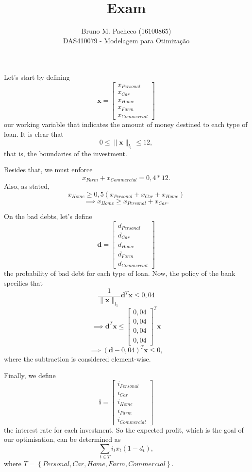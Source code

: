 \documentclass[a4paper]{report}
\begin{document}
 
\title{Exam}
\author{Bruno M. Pacheco (16100865)\\
DAS410079 - Modelagem para Otimização}
 
\maketitle
 

Let's start  by defining \[
\bm{x} = \begin{bmatrix} x_{Personal} \\ x_{Car} \\ x_{Home} \\ x_{Farm} \\ x_{Commercial} \end{bmatrix} 
\] our working variable that indicates the amount of money destined to each type of loan. It is clear that \[
0\le \|\bm{x}\|_{l_1} \le 12
,\] that is, the boundaries of the investment.

Besides that, we must enforce \[
x_{Farm} + x_{Commercial} = 0,4 * 12
.\] Also, as stated, \[
x_{Home} \ge 0,5 \left( x_{Personal} + x_{Car} + x_{Home} \right) 
\] \[
\implies x_{Home} \ge  x_{Personal} + x_{Car}
.\] 

On the bad debts, let's define \[
    \bm{d} = \begin{bmatrix} d_{Personal} \\ d_{Car} \\ d_{Home} \\ d_{Farm} \\ d_{Commercial} \end{bmatrix} 
\] the probability of bad debt for each type of loan. Now, the policy of the bank specifies that \[
    \frac{1}{\|\bm{x}\|_{l_1}} \bm{d}^{T}\bm{x} \le 0,04
\] \[
    \implies \bm{d}^{T}\bm{x} \le \begin{bmatrix} 0,04 \\ 0,04 \\ 0,04 \\ 0,04 \end{bmatrix} ^{T} \bm{x}
\] \[
\implies \left( \bm{d} - 0,04 \right)^{T} \bm{x} \le  0
,\] where the subtraction is considered element-wise.

Finally, we define \[
    \bm{i} = \begin{bmatrix} i_{Personal} \\ i_{Car} \\ i_{Home} \\ i_{Farm} \\ i_{Commercial} \end{bmatrix} 
\] the interest rate for each investment. So the expected profit, which is the goal of our optimisation, can be determined as \[
\sum_{t \in T} i_t x_t \left( 1-d_t \right)
,\] where $T=\left\{ Personal, Car, Home, Farm, Commercial \right\} $.
\end{document}
